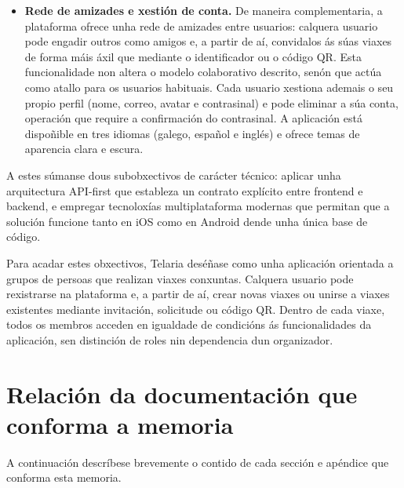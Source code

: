 \begin{itemize}
  \item \textbf{Rede de amizades e xestión de conta.} De maneira complementaria, a plataforma
        ofrece unha rede de amizades entre usuarios: calquera usuario pode engadir outros como
        amigos e, a partir de aí, convidalos ás súas viaxes de forma máis áxil que mediante o
        identificador ou o código QR. Esta funcionalidade non altera o modelo colaborativo
        descrito, senón que actúa como atallo para os usuarios habituais. Cada usuario xestiona
        ademais o seu propio perfil (nome, correo, avatar e contrasinal) e pode eliminar a súa
        conta, operación que require a confirmación do contrasinal. A aplicación está dispoñible
        en tres idiomas (galego, español e inglés) e ofrece temas de aparencia clara e escura.
\end{itemize}

A estes súmanse dous subobxectivos de carácter técnico: aplicar unha arquitectura 
API-first que estableza un contrato explícito entre frontend e backend, e empregar 
tecnoloxías multiplataforma modernas que permitan que a solución funcione tanto en iOS 
como en Android dende unha única base de código.

Para acadar estes obxectivos, Telaria deséñase como unha aplicación orientada a grupos 
de persoas que realizan viaxes conxuntas. Calquera usuario pode rexistrarse na 
plataforma e, a partir de aí, crear novas viaxes ou unirse a viaxes existentes 
mediante invitación, solicitude ou código QR. Dentro de cada viaxe, todos os membros 
acceden en igualdade de condicións ás funcionalidades da aplicación, sen distinción de 
roles nin dependencia dun organizador.

\newpage
\section{Relación da documentación que conforma a memoria}

A continuación descríbese brevemente o contido de cada sección e apéndice que conforma esta memoria.

